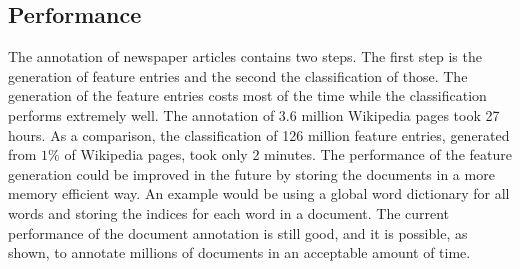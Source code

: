 \subsection*{Performance}
The annotation of newspaper articles contains two steps. The first step is the generation of feature entries and the second the classification of those. The generation of the feature entries costs most of the time while the classification performs extremely well. The annotation of 3.6 million Wikipedia pages took 27 hours. As a comparison, the classification of 126 million feature entries, generated from $1\%$ of Wikipedia pages, took only 2 minutes. The performance of the feature generation could be improved in the future by storing the documents in a more memory efficient way. An example would be using a global word dictionary for all words and storing the indices for each word in a document. The current performance of the document annotation is still good, and it is possible, as shown, to annotate millions of documents in an acceptable amount of time.\par
